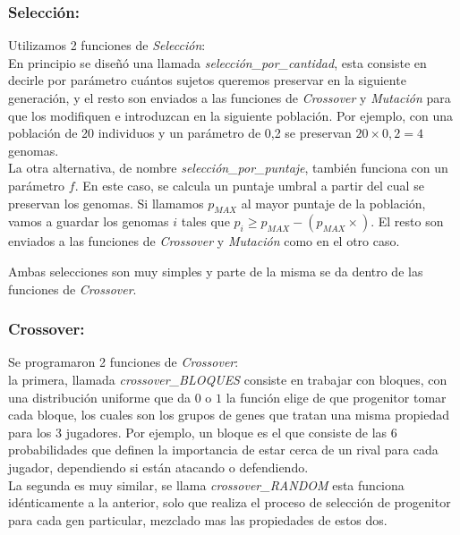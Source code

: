 \subsubsection{Selección:} \label{genetico-seleccion}

Utilizamos 2 funciones de \emph{Selección}:\\

En principio se diseñó una llamada \emph{selección\_por\_cantidad}, esta consiste en decirle por parámetro cuántos
sujetos queremos preservar en la siguiente generación, y el resto son enviados a las funciones de \emph{Crossover} y \emph{Mutación} para que
los modifiquen e introduzcan en la siguiente población.
Por ejemplo, con una población de 20 individuos y un parámetro de 0,2 se preservan $20 \times 0,2 = 4$ genomas.\\

La otra alternativa, de nombre \emph{selección\_por\_puntaje}, también funciona con un parámetro $f$. En este caso, se calcula un puntaje umbral a partir del cual se preservan los genomas. Si llamamos $p_{MAX}$ al mayor puntaje de la población, vamos a guardar los genomas $i$ tales que $p_{i} \geq p_{MAX} - (p_{MAX} \times )$.
El resto son enviados a las funciones de \emph{Crossover} y \emph{Mutación} como en el otro caso.


Ambas selecciones son muy simples y parte de la misma se da dentro de las funciones de \emph{Crossover}.

\subsubsection{Crossover:}
Se programaron 2 funciones de \emph{Crossover}:\\

la primera, llamada \emph{crossover\_BLOQUES} consiste en trabajar con bloques, con una distribución uniforme que da $0$ o $1$
la función elige de que progenitor tomar cada bloque, los cuales son los grupos de genes que tratan una misma propiedad para los
3 jugadores. Por ejemplo, un bloque es el que consiste de las 6 probabilidades que definen la importancia de estar cerca de un rival
para cada jugador, dependiendo si están atacando o defendiendo.\\

La segunda es muy similar, se llama \emph{crossover\_RANDOM} esta funciona idénticamente a la anterior, solo que realiza el proceso
de selección de progenitor para cada gen particular, mezclado mas las propiedades de estos dos.\\

